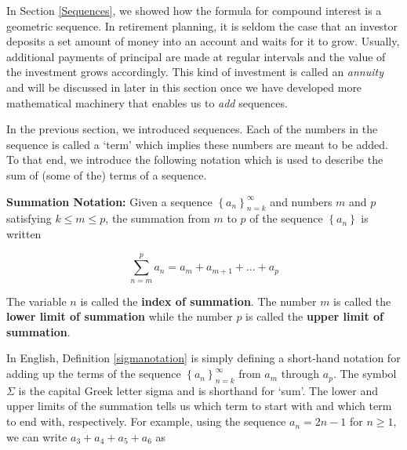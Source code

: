 \documentclass{ximera}
\begin{document}
	\author{Stitz-Zeager}




\setcounter{footnote}{0}

\label{Summation}


In Section \ref{Sequences}, we showed how the formula for compound interest is a geometric sequence.  In retirement planning, it is seldom the case that an investor deposits a set amount of money into an account and waits for it to grow.  Usually, additional payments of principal are made at regular intervals and the value of the investment grows accordingly.  This kind of investment is called an \textit{annuity} and will be discussed in later in this section once we have developed more mathematical machinery that enables us to \textit{add} sequences.


\medskip


In the previous section, we introduced sequences.  Each of the numbers in the sequence is called a `term' which implies these numbers are meant to be added.  To that end, we introduce the following notation which is used to describe  the sum of (some of the) terms of a sequence.
 


\begin{definition} \textbf{Summation Notation:} \label{sigmanotation}  Given a sequence $\left\{ a_{n} \right\}_{n=k}^{\infty}$ and numbers $m$ and $p$ satisfying $k \leq m \leq p$, the summation from $m$ to $p$ of the sequence $\left\{a_{n}\right\}$ is written  

\[ \sum_{n=m}^{p} a_{n} = a_{m} + a_{m +1} + \ldots + a_{p}\]

The variable $n$ is called the  \textbf{index of summation}.   The number $m$ is called the  \textbf{lower limit of summation} while the number $p$ is called the  \textbf{upper limit of summation}.

\end{definition}



 

In English, Definition \ref{sigmanotation} is simply defining a short-hand notation for adding up the terms of the sequence $\left\{ a_{n} \right\}_{n=k}^{\infty}$  from $a_{m}$ through $a_{p}$. The symbol $\Sigma$ is the capital Greek letter sigma and is shorthand for `sum'.  The lower and upper limits of the summation tells us which term to start with and which term to end with, respectively. For example, using the sequence $a_{n} = 2n-1$ for $n \geq 1$, we can write  $a_{3} +a_{4} + a_{5} + a_{6}$ as 
\end{document}

